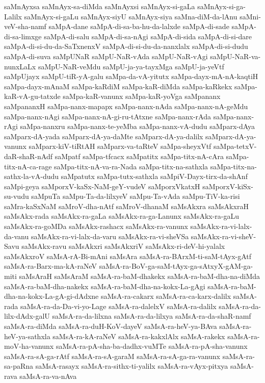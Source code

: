 {saMnAyxsa
saMnAyx-sa-diMda
saMnAyxsi
saMnAyx-si-gaLa
saMnAyx-si-ga-Lalilx
saMnAyx-si-gaLu
saMnAyx-siyU
saMnAyx-siya
saMna-diM-da-lAnu
saMni-veV-sha-namf
saMpA-dane
saMpA-di-sa-ba-hu-da-lalxde
saMpA-di-sade
saMpA-di-sa-limxge
saMpA-di-salu
saMpA-di-sa-nAgi
saMpA-di-sida
saMpA-di-si-dare
saMpA-di-si-du-da-SaTxnenxV
saMpA-di-si-du-da-nanxlalx
saMpA-di-si-dudu
saMpA-di-suva
saMpUNaR
saMpU-NaR-vAda
saMpU-NaR-vAgi
saMpU-NaR-va-nunxLaLx
saMpU-NaR-veMdu
saMpU-ja-ya-tayxMga
saMpU-ja-yeVtf
saMpUjayx
saMpU-tiR-yA-galu
saMpa-da-vA-yitutx
saMpa-dayx-mA-nA-kaqtiH
saMpa-dayx-mAnaM
saMpa-kaRdiM
saMpa-kaR-diMda
saMpa-kaRkekx
saMpa-kaR-vA-gu-tatxde
saMpa-kaR-vanunx
saMpa-kaR-yoVga
saMpananx
saMpananxH
saMpa-nanx-mapapx
saMpa-nanx-nAda
saMpa-nanx-nA-geMdu
saMpa-nanx-nAgi
saMpa-nanx-nA-gi-ru-tAtxne
saMpa-nanx-rAda
saMpa-nanx-rAgi
saMpa-nanxru
saMpa-nanx-te-yeMba
saMpa-nanx-vA-dudu
saMparx-dAya
saMparx-dA-yada
saMparx-dA-ya-daMte
saMparx-dA-ya-dalilx
saMparx-dA-ya-vanunx
saMparx-kiV-tiRtAH
saMparx-va-taRteV
saMpa-sheyxVtf
saMpa-tetxV-daR-shaR-nAdf
saMpatf
saMpa-tfcacx
saMpatitx
saMpa-titx-nA-cAra
saMpa-titx-nA-ca-rage
saMpa-titx-nA-va-ra-Nada
saMpa-titx-na-sathxla
saMpa-titx-na-sathx-la-vA-dudu
saMpatutx
saMpa-tutx-sathxla
saMpiV-Dayx-tirx-da-shAnf
saMpi-geya
saMporxV-kaSx-NaM-geY-vudeV
saMporxVkatxH
saMporxV-kiSx-su-vudu
saMpuTa
saMpu-Ta-da-lilxyeV
saMpu-Ta-vAda
saMpu-TiV-ka-risi
saMra-kaSxNaM
saMroV-dha-nAtf
saMroV-dhanaM
saMsAkxra
saMsAkxraH
saMsAkx-rada
saMsAkx-ra-gaLa
saMsAkx-ra-ga-Lanunx
saMsAkx-ra-gaLu
saMsAkx-ra-goMDa
saMsAkx-rashacx
saMsAkx-ra-vanunx
saMsAkx-ra-vi-lalx-da-vanu
saMsAkx-ra-vi-lalx-da-varu
saMsAkx-ra-vi-sheVSa
saMsAkx-ra-vi-sheV-Savu
saMsAkx-ravu
saMsAkxri
saMsAkxriV
saMsAkx-ri-deV-hi-yalalx
saMsAkxroV
saMsA-rA-Bi-mAni
saMsAra
saMsA-ra-BArxM-ti-saM-tAyx-gAtf
saMsA-ra-Barx-ma-kA-raNeV
saMsA-ra-BoV-ga-saM-tAyx-ga-sAtxyX-gAM-ga-miti
saMsAraH
saMsAraM
saMsA-ra-baM-dhakekx
saMsA-ra-baM-dha-na-diMda
saMsA-ra-baM-dha-nakekx
saMsA-ra-baM-dha-na-kokx-La-gAgi
saMsA-ra-baM-dha-na-kokx-La-gA-gi-dAdxne
saMsA-ra-cakarx
saMsA-ra-ca-karx-dalilx
saMsA-rada
saMsA-ra-da-Da-vi-yo-Lage
saMsA-ra-dalelxV
saMsA-ra-dalilx
saMsA-ra-da-lilx-dAdx-galU
saMsA-ra-da-lilxna
saMsA-ra-da-lilxya
saMsA-ra-da-shaR-namf
saMsA-ra-diMda
saMsA-ra-duH-KoV-dayeV
saMsA-ra-heV-ya-BAva
saMsA-ra-heV-ya-sathxla
saMsA-ra-kA-raNeV
saMsA-ra-kakxlAlx
saMsA-rakekx
saMsA-ra-moV-ha-vanunx
saMsA-ra-pA-sha-ba-dadhx-vuMTe
saMsA-ra-pA-sha-vanunx
saMsA-ra-sA-ga-rAtf
saMsA-ra-sA-garaM
saMsA-ra-sA-ga-ra-vanunx
saMsA-ra-sa-paRna
saMsA-rasayx
saMsA-ra-sithx-ti-yalilx
saMsA-ra-vAyx-pitxya
saMsA-rava
saMsA-ra-va-nAva
}
